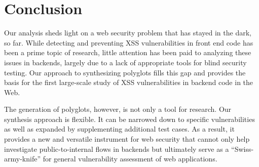 \section{Conclusion}%
Our analysis sheds light on a web security problem that has stayed in the dark, so far.
While detecting and preventing XSS vulnerabilities in front end code has been a prime topic of research, little attention has been paid to analyzing these issues in backends, largely due to a lack of appropriate tools for blind security testing.
Our approach to synthesizing polyglots fills this gap and provides the basis for the first large-scale study of XSS vulnerabilities in backend code in the Web.

The generation of polyglots, however, is not only a tool for research.
Our synthesis approach is flexible.
It can be narrowed down to specific vulnerabilities as well as expanded by supplementing additional test cases.
As a result, it provides a new and versatile instrument for web security that cannot only help investigate public-to-internal flows in backends but ultimately serve as a ``Swiss-army-knife'' for general vulnerability assessment of web applications.
